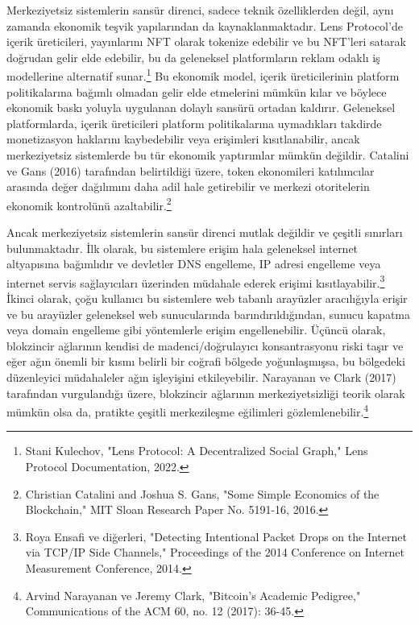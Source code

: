 \documentclass[11pt,a4paper]{article}
\begin{document}
Merkeziyetsiz sistemlerin sansür direnci, sadece teknik özelliklerden değil, aynı zamanda ekonomik teşvik yapılarından da kaynaklanmaktadır. Lens Protocol'de içerik üreticileri, yayınlarını NFT olarak tokenize edebilir ve bu NFT'leri satarak doğrudan gelir elde edebilir, bu da geleneksel platformların reklam odaklı iş modellerine alternatif sunar.\footnote{Stani Kulechov, "Lens Protocol: A Decentralized Social Graph," Lens Protocol Documentation, 2022.} Bu ekonomik model, içerik üreticilerinin platform politikalarına bağımlı olmadan gelir elde etmelerini mümkün kılar ve böylece ekonomik baskı yoluyla uygulanan dolaylı sansürü ortadan kaldırır. Geleneksel platformlarda, içerik üreticileri platform politikalarına uymadıkları takdirde monetizasyon haklarını kaybedebilir veya erişimleri kısıtlanabilir, ancak merkeziyetsiz sistemlerde bu tür ekonomik yaptırımlar mümkün değildir. Catalini ve Gans (2016) tarafından belirtildiği üzere, token ekonomileri katılımcılar arasında değer dağılımını daha adil hale getirebilir ve merkezi otoritelerin ekonomik kontrolünü azaltabilir.\footnote{Christian Catalini and Joshua S. Gans, "Some Simple Economics of the Blockchain," MIT Sloan Research Paper No. 5191-16, 2016.}

Ancak merkeziyetsiz sistemlerin sansür direnci mutlak değildir ve çeşitli sınırları bulunmaktadır. İlk olarak, bu sistemlere erişim hala geleneksel internet altyapısına bağımlıdır ve devletler DNS engelleme, IP adresi engelleme veya internet servis sağlayıcıları üzerinden müdahale ederek erişimi kısıtlayabilir.\footnote{Roya Ensafi ve diğerleri, "Detecting Intentional Packet Drops on the Internet via TCP/IP Side Channels," Proceedings of the 2014 Conference on Internet Measurement Conference, 2014.} İkinci olarak, çoğu kullanıcı bu sistemlere web tabanlı arayüzler aracılığıyla erişir ve bu arayüzler geleneksel web sunucularında barındırıldığından, sunucu kapatma veya domain engelleme gibi yöntemlerle erişim engellenebilir. Üçüncü olarak, blokzincir ağlarının kendisi de madenci/doğrulayıcı konsantrasyonu riski taşır ve eğer ağın önemli bir kısmı belirli bir coğrafi bölgede yoğunlaşmışsa, bu bölgedeki düzenleyici müdahaleler ağın işleyişini etkileyebilir. Narayanan ve Clark (2017) tarafından vurgulandığı üzere, blokzincir ağlarının merkeziyetsizliği teorik olarak mümkün olsa da, pratikte çeşitli merkezileşme eğilimleri gözlemlenebilir.\footnote{Arvind Narayanan ve Jeremy Clark, "Bitcoin's Academic Pedigree," Communications of the ACM 60, no. 12 (2017): 36-45.}
\end{document}

